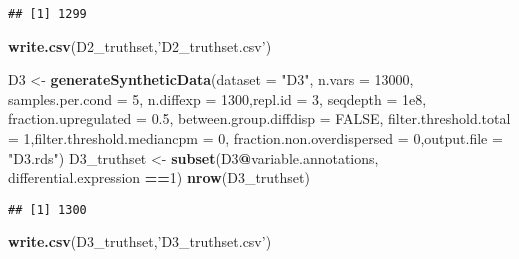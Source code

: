 \documentclass[]{article}
\newenvironment{Shaded}{\begin{snugshade}}{\end{snugshade}}
\newcommand{\DataTypeTok}[1]{\textcolor[rgb]{0.13,0.29,0.53}{#1}}
\newcommand{\DecValTok}[1]{\textcolor[rgb]{0.00,0.00,0.81}{#1}}
\newcommand{\FloatTok}[1]{\textcolor[rgb]{0.00,0.00,0.81}{#1}}
\newcommand{\KeywordTok}[1]{\textcolor[rgb]{0.13,0.29,0.53}{\textbf{#1}}}
\newcommand{\NormalTok}[1]{#1}
\newcommand{\OperatorTok}[1]{\textcolor[rgb]{0.81,0.36,0.00}{\textbf{#1}}}
\newcommand{\OtherTok}[1]{\textcolor[rgb]{0.56,0.35,0.01}{#1}}
\newcommand{\StringTok}[1]{\textcolor[rgb]{0.31,0.60,0.02}{#1}}
\begin{document}
\begin{verbatim}
## [1] 1299
\end{verbatim}

\begin{Shaded}
\begin{Highlighting}[]
\KeywordTok{write.csv}\NormalTok{(D2_truthset,}\StringTok{'D2_truthset.csv'}\NormalTok{)}
\end{Highlighting}
\end{Shaded}

\begin{Shaded}
\begin{Highlighting}[]
\NormalTok{D3 <-}\StringTok{ }\KeywordTok{generateSyntheticData}\NormalTok{(}\DataTypeTok{dataset =} \StringTok{"D3"}\NormalTok{, }\DataTypeTok{n.vars =} \DecValTok{13000}\NormalTok{,}
             \DataTypeTok{samples.per.cond =} \DecValTok{5}\NormalTok{, }\DataTypeTok{n.diffexp =} \DecValTok{1300}\NormalTok{,}\DataTypeTok{repl.id =} \DecValTok{3}\NormalTok{, }\DataTypeTok{seqdepth =} \FloatTok{1e8}\NormalTok{,}
             \DataTypeTok{fraction.upregulated =} \FloatTok{0.5}\NormalTok{, }\DataTypeTok{between.group.diffdisp =} \OtherTok{FALSE}\NormalTok{,}
             \DataTypeTok{filter.threshold.total =} \DecValTok{1}\NormalTok{,}\DataTypeTok{filter.threshold.mediancpm =} \DecValTok{0}\NormalTok{,}
             \DataTypeTok{fraction.non.overdispersed =} \DecValTok{0}\NormalTok{,}\DataTypeTok{output.file =} \StringTok{"D3.rds"}\NormalTok{)}
\NormalTok{D3_truthset <-}\StringTok{ }\KeywordTok{subset}\NormalTok{(D3}\OperatorTok{@}\NormalTok{variable.annotations, differential.expression }\OperatorTok{==}\DecValTok{1}\NormalTok{)}
\KeywordTok{nrow}\NormalTok{(D3_truthset)}
\end{Highlighting}
\end{Shaded}

\begin{verbatim}
## [1] 1300
\end{verbatim}

\begin{Shaded}
\begin{Highlighting}[]
\KeywordTok{write.csv}\NormalTok{(D3_truthset,}\StringTok{'D3_truthset.csv'}\NormalTok{)}
\end{Highlighting}
\end{Shaded}
\end{document}
